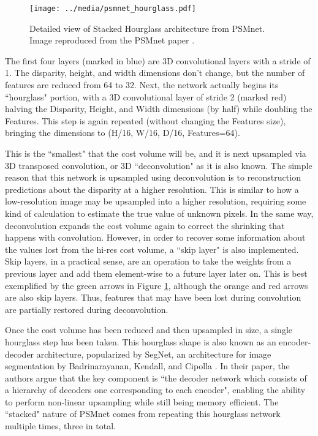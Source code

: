 \begin{figure}[ht]
	\texttt{[image: ../media/psmnet\_hourglass.pdf]}
	\caption{Detailed view of Stacked Hourglass architecture from PSMnet. Image reproduced from the PSMnet paper \cite{chang_pyramid_2018}.}
	\label{psmnet_hourglass}
\end{figure}

The first four layers (marked in blue) are 3D convolutional layers with a stride of 1. The disparity, height, and width dimensions don't change, but the number of features are reduced from 64 to 32. Next, the network actually begins its ``hourglass" portion, with a 3D convolutional layer of stride 2 (marked red) halving the Disparity, Height, and Width dimensions (by half) while doubling the Features. This step is again repeated (without changing the Features size), bringing the dimensions to (H/16, W/16, D/16, Features=64). 

This is the ``smallest" that the cost volume will be, and it is next upsampled via 3D transposed convolution, or 3D ``deconvolution" as it is also known. The simple reason that this network is upsampled using deconvolution is to reconstruction predictions about the disparity at a higher resolution. This is similar to how a low-resolution image may be upsampled into a higher resolution, requiring some kind of calculation to estimate the true value of unknown pixels. In the same way, deconvolution expands the cost volume again to correct the shrinking that happens with convolution. However, in order to recover some information about the values lost from the hi-res cost volume, a ``skip layer" is also implemented. Skip layers, in a practical sense, are an operation to take the weights from a previous layer and add them element-wise to a future layer later on. This is best exemplified by the green arrows in Figure \ref{psmnet_hourglass}, although the orange and red arrows are also skip layers. Thus, features that may have been lost during convolution are partially restored during deconvolution. 

Once the cost volume has been reduced and then upsampled in size, a single hourglass step has been taken. This hourglass shape is also known as an encoder-decoder architecture, popularized by SegNet, an architecture for image segmentation by Badrinarayanan, Kendall, and Cipolla  \cite{badrinarayanan_segnet:_2017}. In their paper, the authors argue that the key component is ``the decoder network which consists of a hierarchy of decoders one corresponding to each encoder", enabling the ability to perform non-linear upsampling while still being memory efficient. The ``stacked" nature of PSMnet comes from repeating this hourglass network multiple times, three in total. 

